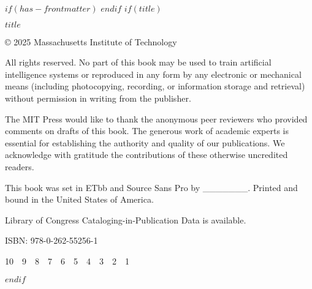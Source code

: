 $if(has-frontmatter)$
\frontmatter
$endif$
$if(title)$

\newgeometry{}
\begin{titlepage}
\end{titlepage}

\begin{titlepage}
  \centering
	{\scshape\Huge $title$\par}\clearpage
\end{titlepage}


\begin{titlepage}
  \vspace*{\fill}
  {\rmfamily\scriptsize
    © 2025 Massachusetts Institute of Technology\par
    All rights reserved. No part of this book may be used to train artificial intelligence systems or reproduced in any form by any electronic or mechanical means (including photocopying, recording, or information storage and retrieval) without permission in writing from the publisher.\par
  The MIT Press would like to thank the anonymous peer reviewers who provided comments on drafts of this book. The generous work of academic experts is essential for establishing the authority and quality of our publications. We acknowledge with gratitude the contributions of these otherwise uncredited readers.\par
  This book was set in ETbb and Source Sans Pro by \_\_\_\_\_\_\_. Printed and bound in the United States of America.\par
  Library of Congress Cataloging-in-Publication Data is available.\par
  ISBN: 978-0-262-55256-1\par
  10 9 8 7 6 5 4 3 2 1\par
  }
  \vspace*{\fill}
\end{titlepage}
$endif$
\restoregeometry{}
